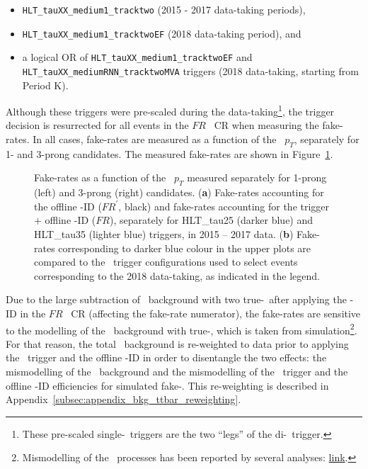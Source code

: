 \begin{itemize}
\item \verb|HLT_tauXX_medium1_tracktwo| (2015 - 2017 data-taking periods),
\item \verb|HLT_tauXX_medium1_tracktwoEF| (2018 data-taking period), and
\item a logical OR of \verb|HLT_tauXX_medium1_tracktwoEF| and \verb|HLT_tauXX_mediumRNN_tracktwoMVA| triggers (2018 data-taking, starting from Period K).
\end{itemize}

Although these triggers were pre-scaled during the data-taking\footnote{These pre-scaled single-\tauhad\ triggers are the two ``legs'' of the di-\tauhad\ trigger.}, the trigger decision is resurrected for all events in the $FR$ \ttbar\ CR when measuring the fake-rates. In all cases, fake-rates are measured as a function of the \tauhad\ $p_T$, separately for 1- and 3-prong candidates. The measured fake-rates are shown in Figure~\ref{fig:hadhadFRs}.

\begin{figure}[!h]
\centering
\captionsetup[subfigure]{justification=centering}

\caption{Fake-rates as a function of the \tauhad\ $p_T$ measured separately for 1-prong (left) and 3-prong (right) candidates. (\textbf{a}) Fake-rates accounting for the offline \tauhad-ID ($FR^\prime$, black) and fake-rates accounting for the trigger $+$ offline \tauhad-ID ($FR$), separately for HLT\_tau25 (darker blue) and HLT\_tau35 (lighter blue) triggers, in 2015 -- 2017 data. (\textbf{b}) Fake-rates corresponding to darker blue colour in the upper plots are compared to the \tauhad\ trigger configurations used to select events corresponding to the 2018 data-taking, as indicated in the legend.}
        \label{fig:hadhadFRs}
\end{figure}

Due to the large subtraction of \ttbar\ background with two true-\tauhad\ after applying the \tauhad-ID in the $FR$ \ttbar\ CR (affecting the fake-rate numerator), the fake-rates are sensitive to the modelling of the \ttbar\ background with true-\tauhad, which is taken from simulation\footnote{Mismodelling of the \ttbar\ processes has been reported by several analyses: \href{https://indico.cern.ch/event/938202/}{link}.}. For that reason, the total \ttbar\ background is re-weighted to data prior to applying the \tauhad\ trigger and the offline \tauhad-ID in order to disentangle the two effects: the mismodelling of the \ttbar\ background and the mismodelling of the \tauhad\ trigger and the offline \tauhad-ID efficiencies for simulated fake-\tauhad. This re-weighting is described in Appendix~\ref{subsec:appendix_bkg_ttbar_reweighting}.

